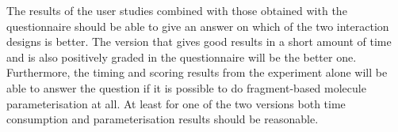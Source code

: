 The results of the user studies combined with those obtained with the questionnaire should be able to give an answer on which of the two interaction designs is better. The version that gives good results in a short amount of time and is also positively graded in the questionnaire will be the better one. Furthermore, the timing and scoring results from the experiment alone will be able to answer the question if it is possible to do fragment-based molecule parameterisation at all. At least for one of the two versions both time consumption and parameterisation results should be reasonable.
